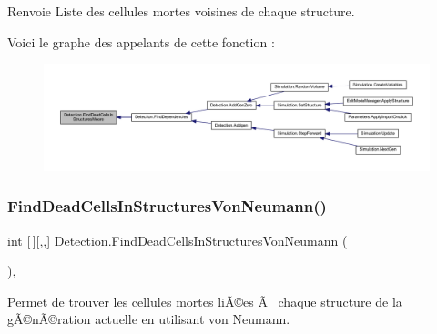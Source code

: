 \begin{DoxyReturn}{Renvoie}
Liste des cellules mortes voisines de chaque structure.
\end{DoxyReturn}
Voici le graphe des appelants de cette fonction \+:
\nopagebreak
\begin{figure}[H]
\begin{center}
\leavevmode
\includegraphics[width=350pt]{class_detection_a018511f85c3fb9eca82fc06c9f4eb031_icgraph}
\end{center}
\end{figure}
\mbox{\label{class_detection_aeea8bac4d15d3dd92d6b907b357c1680}} 
\subsubsection{\texorpdfstring{Find\+Dead\+Cells\+In\+Structures\+Von\+Neumann()}{FindDeadCellsInStructuresVonNeumann()}}
{\footnotesize\ttfamily int \mbox{[}$\,$\mbox{]}\mbox{[},,\mbox{]} Detection.\+Find\+Dead\+Cells\+In\+Structures\+Von\+Neumann (\begin{DoxyParamCaption}{ }\end{DoxyParamCaption})\hspace{0.3cm}{\ttfamily [inline]}, {\ttfamily [private]}}



Permet de trouver les cellules mortes liÃ©es Ã  chaque structure de la gÃ©nÃ©ration actuelle en utilisant von Neumann. 

